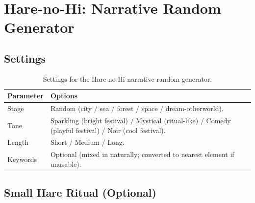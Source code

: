 
\chapter{Hare-no-Hi: Narrative Random Generator}
\label{ch:hare-no-hi-narrative}


\section{Settings}
\label{sec:narrative-settings}

\begin{table}[ht]
\centering
\small
\begin{tabularx}{\linewidth}{lX}
\toprule
\textbf{Parameter} & \textbf{Options} \\
\midrule
Stage
& Random (city / sea / forest / space / dream-otherworld). \\
Tone
& Sparkling (bright festival) / Mystical (ritual-like) /
Comedy (playful festival) / Noir (cool festival). \\
Length
& Short / Medium / Long. \\
Keywords
& Optional (mixed in naturally; converted to nearest element if
unusable). \\
\bottomrule
\end{tabularx}
\caption[Narrative generator settings]{Settings for the Hare-no-Hi
narrative random generator.}
\label{tab:narrative-settings}
\end{table}

\section{Small Hare Ritual (Optional)}
\label{sec:narrative-small-ritual}

